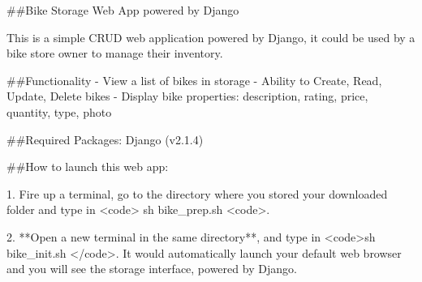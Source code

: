 ##Bike Storage Web App powered by Django

This is a simple CRUD web application powered by Django, it could be used by a bike store owner to manage their inventory.

##Functionality
- View a list of bikes in storage
- Ability to Create, Read, Update, Delete bikes
- Display bike properties: description, rating, price, quantity, type, photo

##Required Packages:
Django (v2.1.4)

##How to launch this web app:

1. Fire up a terminal, go to the directory where you stored your downloaded folder and type in <code> sh bike_prep.sh <code>.

2. **Open a new terminal in the same directory**, and type in <code>sh bike_init.sh </code>. It would automatically launch your default web 
browser and you will see the storage interface, powered by Django.
